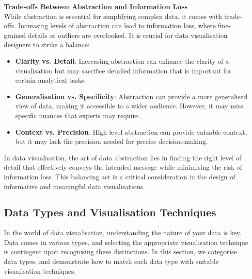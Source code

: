 \documentclass{article}\usepackage[]{graphicx}\usepackage[]{xcolor}
\begin{document}
\textbf{Trade-offs Between Abstraction and Information Loss}\\
While abstraction is essential for simplifying complex data, it comes with trade-offs. Increasing levels of abstraction can lead to information loss, where fine-grained details or outliers are overlooked. It is crucial for data visualisation designers to strike a balance:
\begin{itemize}
    \item \textbf{Clarity vs. Detail}: Increasing abstraction can enhance the clarity of a visualisation but may sacrifice detailed information that is important for certain analytical tasks.
    \item \textbf{Generalisation vs. Specificity}: Abstraction can provide a more generalised view of data, making it accessible to a wider audience. However, it may miss specific nuances that experts may require.
    \item \textbf{Context vs. Precision}: High-level abstraction can provide valuable context, but it may lack the precision needed for precise decision-making.
\end{itemize}
In data visualisation, the art of data abstraction lies in finding the right level of detail that effectively conveys the intended message while minimising the risk of information loss. This balancing act is a critical consideration in the design of informative and meaningful data visualisations.


\subsection{Data Types and Visualisation Techniques}
In the world of data visualisation, understanding the nature of your data is key. Data comes in various types, and selecting the appropriate visualisation technique is contingent upon recognising these distinctions. In this section, we categorise data types, and demonstrate how to match each data type with suitable visualisation techniques.
\end{document}
